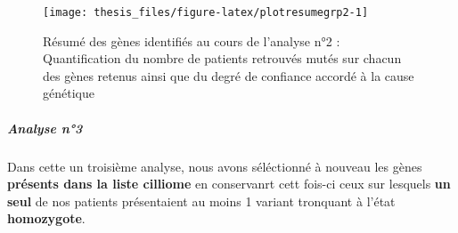 \documentclass[12pt,twoside]{reedthesis}
\theoremstyle{definition}
\theoremstyle{definition}
\theoremstyle{remark}
\begin{document}
  \newpage
  
  \begin{figure}
  
  {\centering \texttt{[image: thesis\_files/figure-latex/plotresumegrp2-1]} 
  
  }
  
  \caption[Résumé des gènes identifiés au cours de l'analyse n°2]{Résumé des gènes identifiés au cours de l'analyse n°2 : Quantification du nombre de patients retrouvés mutés sur chacun des gènes retenus ainsi que du degré de confiance accordé à la cause génétique}\label{fig:plotresumegrp2}
  \end{figure}
  
  \newpage
  
  \subparagraph{Analyse n°3}\label{analyse-n3}
  
  Dans cette un troisième analyse, nous avons séléctionné à nouveau les
  gènes \textbf{présents dans la liste cilliome} en conservanrt cett
  fois-ci ceux sur lesquels \textbf{un seul} de nos patients présentaient
  au moins 1 variant tronquant à l'état \textbf{homozygote}.
  
\end{document}
